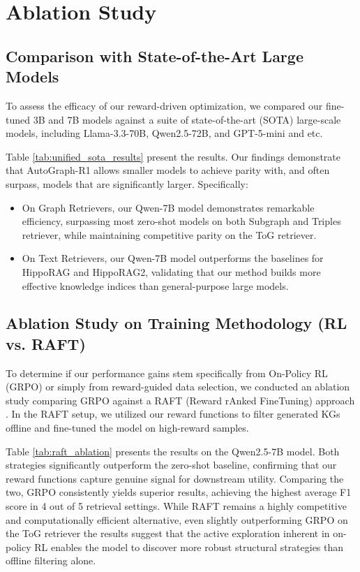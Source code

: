 \documentclass[11pt]{article}
\begin{document}
% 



\clearpage
\appendix

\section{Ablation Study}
\label{sec:appendix_ablation}
\subsection{Comparison with State-of-the-Art Large Models}
To assess the efficacy of our reward-driven optimization, we compared our fine-tuned 3B and 7B models against a suite of state-of-the-art (SOTA) large-scale models, including Llama-3.3-70B, Qwen2.5-72B, and GPT-5-mini and etc.

Table \ref{tab:unified_sota_results} present the results. Our findings demonstrate that AutoGraph-R1 allows smaller models to achieve parity with, and often surpass, models that are significantly larger. Specifically: \begin{itemize} \item On Graph Retrievers, our Qwen-7B model demonstrates remarkable efficiency, surpassing most zero-shot models on both Subgraph and Triples retriever, while maintaining competitive parity on the ToG retriever. \item On Text Retrievers, our Qwen-7B model outperforms the baselines for HippoRAG and HippoRAG2, validating that our method builds more effective knowledge indices than general-purpose large models. \end{itemize}



\subsection{Ablation Study on Training Methodology (RL vs. RAFT)}
To determine if our performance gains stem specifically from On-Policy RL (GRPO) or simply from reward-guided data selection, we conducted an ablation study comparing GRPO against a RAFT (Reward rAnked FineTuning) approach \citep{dong_raft_2023}. In the RAFT setup, we utilized our reward functions to filter generated KGs offline and fine-tuned the model on high-reward samples.

Table \ref{tab:raft_ablation} presents the results on the Qwen2.5-7B model. Both strategies significantly outperform the zero-shot baseline, confirming that our reward functions capture genuine signal for downstream utility. Comparing the two, GRPO consistently yields superior results, achieving the highest average F1 score in 4 out of 5 retrieval settings. While RAFT remains a highly competitive and computationally efficient alternative, even slightly outperforming GRPO on the ToG retriever the results suggest that the active exploration inherent in on-policy RL enables the model to discover more robust structural strategies than offline filtering alone.
\end{document}
